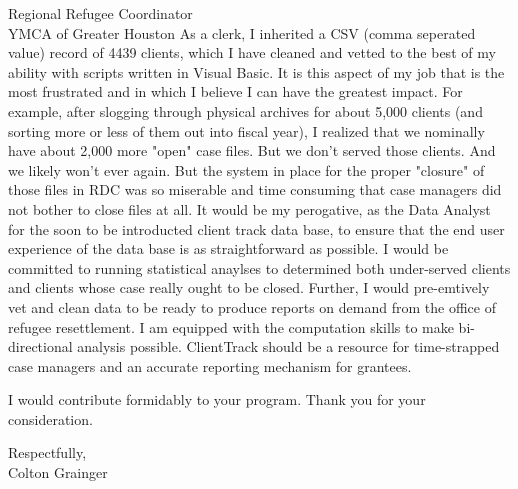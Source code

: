 \documentclass[10pt]{letter}
\begin{document}
\begin{letter}{
Regional Refugee Coordinator\\
YMCA of Greater Houston
}
	As a clerk, I inherited a CSV (comma seperated value) record of 4439 clients, which I have cleaned and vetted to the best of my ability with scripts written in Visual Basic. It is this aspect of my job that is the most frustrated and in which I believe I can have the greatest impact. For example, after slogging through physical archives for about 5,000 clients (and sorting more or less of them out into fiscal year), I realized that we nominally have about 2,000 more "open" case files. But we don't served those clients. And we likely won't ever again. But the system in place for the proper "closure" of those files in RDC was so miserable and time consuming that case managers did not bother to close files at all. It would be my perogative, as the Data Analyst for the soon to be introducted client track data base, to ensure that the end user experience of the data base is as straightforward as possible. I would be committed to running statistical anaylses to determined both under-served clients and clients whose case really ought to be closed. Further, I would pre-emtively vet and clean data to be ready to produce reports on demand from the office of refugee resettlement. I am equipped with the computation skills to make bi-directional analysis possible. ClientTrack should be a resource for time-strapped case managers and an accurate reporting mechanism for grantees.

I would contribute formidably to your program. Thank you for your consideration.

\closing{Respectfully,\\Colton Grainger}
\end{letter}
\end{document}
